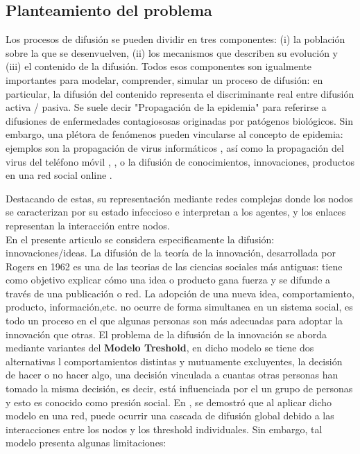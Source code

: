 \documentclass{article}
\begin{document}
 \subsection{Planteamiento del problema}
Los procesos de difusión se pueden dividir en tres componentes: (i) la población sobre la que se desenvuelven, (ii) los mecanismos que describen su evolución y (iii) el contenido de la difusión. Todos esos  componentes son igualmente importantes para modelar, comprender, simular un proceso de difusión: en particular, la difusión del contenido representa el discriminante real entre difusión activa / pasiva. 
Se suele decir "Propagación de la epidemia" para referirse a difusiones de enfermedades contagiososas originadas por patógenos biológicos. Sin embargo, una plétora de fenómenos pueden vincularse al concepto de epidemia: ejemplos son la propagación de virus informáticos \cite[Szor 2004]{Szor:2004}, así como la  propagación del virus del teléfono móvil \cite[Havlin 2009]{Haviln:2009}, \cite[Wang 2013]{Wang:2013}, o la difusión de conocimientos, innovaciones, productos en una red social online \cite[Burt 1987]{Burt:1987}.

Destacando de estas, su representación mediante redes complejas donde los nodos se caracterizan por su estado infeccioso e interpretan a los agentes, y los enlaces representan la interacción entre nodos.
\\
En el presente articulo se considera especificamente la difusión: innovaciones/ideas. La difusión de la teoría de la innovación, desarrollada por Rogers en 1962 \cite*{rogers:2003} es una de las teorias de las ciencias sociales más antiguas: tiene como objetivo explicar cómo una idea o producto gana fuerza y se difunde a través de una publicación o red. La adopción de una nueva idea, comportamiento, producto, información,etc. no ocurre de forma simultanea en un sistema social, es todo un proceso en el que algunas personas son más adecuadas para adoptar la innovación que otras. El problema de la difusión de la innovación se aborda mediante variantes del \textbf{Modelo Treshold}, en dicho modelo se tiene dos alternativas l comportamientos distintas y mutuamente excluyentes, la decisión de hacer o no hacer algo, una decisión vinculada a cuantas otras personas han tomado la misma decisión, es decir, está influenciada por el un grupo de personas y esto es conocido como presión social. En \cite[Watts 2002]{watts:2002}, se demostró que al aplicar dicho modelo en una red, puede ocurrir una cascada de difusión global debido a las interacciones entre los nodos y los threshold individuales. Sin embargo, tal modelo presenta algunas limitaciones: 
\end{document}
